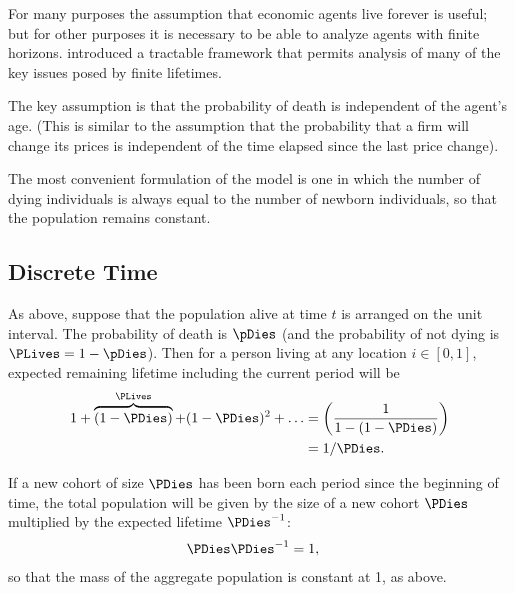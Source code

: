 \documentclass{handout}
\begin{document}
For many purposes the assumption that economic agents live forever is useful;
but for other purposes it is necessary to be able to analyze agents with finite horizons.  \cite{blanchardFinite} introduced a 
tractable framework that permits analysis of many of the key issues
posed by finite lifetimes.  

The key assumption  is that the probability
of death is independent of the agent's age.  (This is similar to the \cite{calvoPrices}
assumption that the probability that a firm will change its prices is independent of the time
elapsed since the last price change).  

The most convenient formulation of the model is one in which the number of dying 
individuals is always equal to the number of newborn individuals, so that the population
remains constant.  

\subsection{Discrete Time} 

As above, suppose that the population alive at time $t$ is arranged on the unit interval.
The probability of death is $\pDies$ (and the probability of not dying is $\PLives = 1-\pDies$).
Then for a person living at any location $i \in [0,1]$, expected remaining lifetime including the 
current period will be 
\begin{equation}\begin{gathered}\begin{aligned}
  1 + \overbrace{(1-\PDies)}^{\PLives} + (1-\PDies)^{2} + \ldots & =  \left(\frac{1}{1-(1-\PDies)}\right)
\\ & =  1/\PDies
.
\end{aligned}\end{gathered}\end{equation}

If a new cohort of size $\PDies$ has been born each period since the beginning of time, the total population will be given by the size of a new cohort $\PDies$ multiplied by the expected lifetime $\PDies^{-1}$:
\begin{equation}\begin{gathered}\begin{aligned}
  \PDies \PDies^{-1} & =  1,
\end{aligned}\end{gathered}\end{equation}
so that the mass of the aggregate population is constant at 1, as above.
\end{document}
